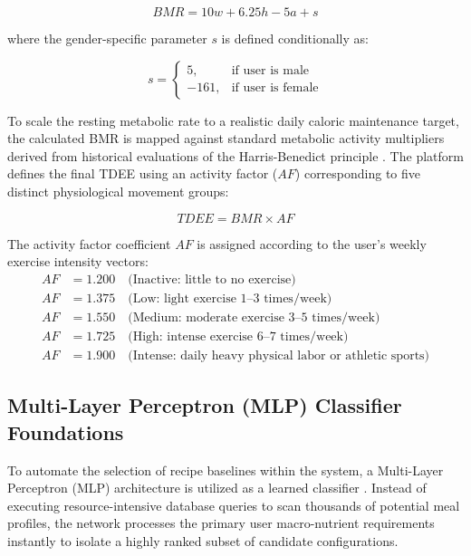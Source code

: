 \begin{equation}
BMR = 10w + 6.25h - 5a + s
\end{equation}

where the gender-specific parameter $s$ is defined conditionally as:

\begin{equation}
s = \begin{cases} 
5, & \text{if user is male} \\
-161, & \text{if user is female}
\end{cases}
\end{equation}

To scale the resting metabolic rate to a realistic daily caloric maintenance target, 
the calculated BMR is mapped against standard metabolic activity multipliers derived 
from historical evaluations of the Harris-Benedict principle \cite{Roza1984}. The 
platform defines the final TDEE using an activity factor ($AF$) corresponding to five 
distinct physiological movement groups:

\begin{equation}
TDEE = BMR \times AF
\end{equation}

The activity factor coefficient $AF$ is assigned according to the user's weekly exercise 
intensity vectors:
\begin{align*}
AF &= 1.200 \quad \text{(Inactive: little to no exercise)} \\
AF &= 1.375 \quad \text{(Low: light exercise 1--3 times/week)} \\
AF &= 1.550 \quad \text{(Medium: moderate exercise 3--5 times/week)} \\
AF &= 1.725 \quad \text{(High: intense exercise 6--7 times/week)} \\
AF &= 1.900 \quad \text{(Intense: daily heavy physical labor or athletic sports)}
\end{align*}

\subsection{Multi-Layer Perceptron (MLP) Classifier Foundations}

To automate the selection of recipe baselines within the system, a Multi-Layer Perceptron
(MLP) architecture is utilized as a learned classifier \cite[Ch.~10]{book:geron:handson:2019}.
Instead of executing resource-intensive database queries to scan thousands of potential meal
profiles, the network processes the primary user macro-nutrient requirements instantly to
isolate a highly ranked subset of candidate configurations.

